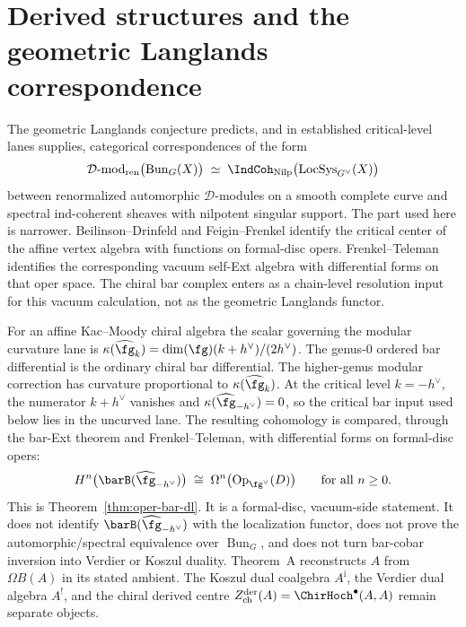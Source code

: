 \providecommand{\Bun}{\operatorname{Bun}}
\providecommand{\Loc}{\operatorname{Loc}}
\providecommand{\Hecke}{\operatorname{Hecke}}
\providecommand{\SpCh}{\mathrm{Sp}^{\mathrm{ch}}}
\providecommand{\PhiFA}{\Phi^{\mathrm{FA}}}

\chapter{Derived structures and the geometric Langlands correspondence}
\label{ch:derived-langlands}


The geometric Langlands conjecture predicts, and in established
critical-level lanes supplies, categorical correspondences of the form
\[
\mathcal{D}\text{-mod}_{\mathrm{ren}}\bigl(\Bun_G(X)\bigr)
\;\simeq\;
\IndCoh_{\mathrm{Nilp}}\bigl(\operatorname{LocSys}_{G^\vee}(X)\bigr)
\]
between renormalized automorphic $\mathcal D$-modules on a smooth
complete curve and spectral ind-coherent sheaves with nilpotent
singular support. The part used here is narrower. Beilinson--Drinfeld
and Feigin--Frenkel identify the critical center of the affine vertex
algebra with functions on formal-disc opers. Frenkel--Teleman
identifies the corresponding vacuum self-Ext algebra with differential
forms on that oper space. The chiral bar complex enters as a
chain-level resolution input for this vacuum calculation, not as the
geometric Langlands functor.

For an affine Kac--Moody chiral algebra the scalar governing the
modular curvature lane is
$\kappa(\widehat{\fg}_k) = \dim(\fg)(k + h^\vee)/(2h^\vee)$.
The genus-$0$ ordered bar differential is the ordinary chiral bar
differential. The higher-genus modular correction has curvature
proportional to $\kappa(\widehat{\fg}_k)$. At the critical level
$k = -h^\vee$, the numerator $k + h^\vee$ vanishes and
$\kappa(\widehat{\fg}_{-h^\vee}) = 0$, so the critical bar input
used below lies in the uncurved lane. The resulting cohomology is
compared, through the bar-Ext theorem and Frenkel--Teleman, with
differential forms on formal-disc opers:
\[
H^n\bigl(\barB(\widehat{\fg}_{-h^\vee})\bigr)
\;\cong\;
\Omega^n\bigl(\mathrm{Op}_{\fg^\vee}(D)\bigr)
\qquad\text{for all } n \ge 0.
\]
This is Theorem~\ref{thm:oper-bar-dl}. It is a formal-disc,
vacuum-side statement. It does not identify
$\barB(\widehat{\fg}_{-h^\vee})$ with the localization functor, does
not prove the automorphic/spectral equivalence over $\Bun_G$, and
does not turn bar-cobar inversion into Verdier or Koszul duality.
Theorem~A reconstructs $A$ from $\Omega B(A)$ in its stated
ambient. The Koszul dual coalgebra $A^{\mathrm i}$, the Verdier dual
algebra $A^!$, and the chiral derived centre
$Z^{\mathrm{der}}_{\mathrm{ch}}(A)=\ChirHoch^\bullet(A,A)$ remain
separate objects.

